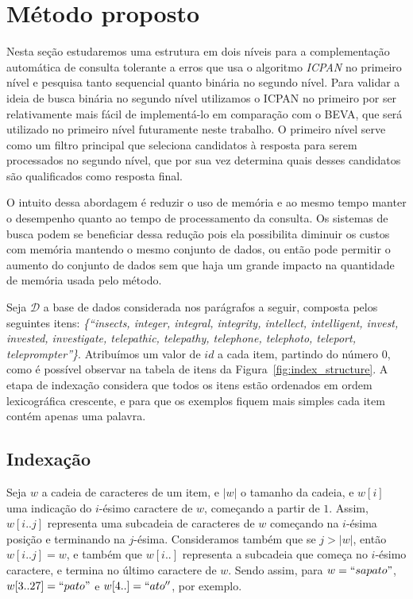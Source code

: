 \section{Método proposto} \label{sec:metodo}

Nesta seção estudaremos uma estrutura em dois níveis para a complementação automática de consulta tolerante a erros que usa o algoritmo \textit{ICPAN} no primeiro nível e pesquisa tanto sequencial quanto binária no segundo nível. Para validar a ideia de busca binária no segundo nível utilizamos o ICPAN no primeiro por ser relativamente mais fácil de implementá-lo em comparação com o BEVA, que será utilizado no primeiro nível futuramente neste trabalho. O primeiro nível serve como um filtro principal que seleciona candidatos à resposta para serem processados no segundo nível, que por sua vez determina quais desses candidatos são qualificados como resposta final.

O intuito dessa abordagem é reduzir o uso de memória e ao mesmo tempo manter o desempenho quanto ao tempo de processamento da consulta. Os sistemas de busca podem se beneficiar dessa redução pois ela possibilita diminuir os custos com memória mantendo o mesmo conjunto de dados, ou então pode permitir o aumento do conjunto de dados sem que haja um grande impacto na quantidade de memória usada pelo método.

Seja $\mathcal{D}$ a base de dados considerada nos parágrafos a seguir, composta pelos seguintes itens: \textit{\{``insects, integer, integral, integrity, intellect, intelligent, invest, invested, investigate, telepathic, telepathy, telephone, telephoto, teleport, teleprompter''\}}. Atribuímos um valor de $id$ a cada item, partindo do número $0$, como é possível observar na tabela de itens da Figura~\ref{fig:index_structure}. A etapa de indexação considera que todos os itens estão ordenados em ordem lexicográfica crescente, e para que os exemplos fiquem mais simples cada item contém apenas uma palavra.
 
\subsection{Indexação} 
\label{sec:indexing}
Seja $w$ a cadeia de caracteres de um item, e $|w|$ o tamanho da cadeia, e $w[i]$ uma indicação do $i$-ésimo caractere de $w$, começando a partir de $1$. Assim, $w[i..j]$ representa uma subcadeia de caracteres de $w$ começando na $i$-ésima posição e terminando na $j$-ésima. Consideramos também que se $j > |w|$, então $w[i..j] = w$, e também que $w[i..]$ representa a subcadeia que começa no $i$-ésimo caractere, e termina no último caractere de $w$. Sendo assim, para $w = ``sapato"$, $w[3..27] =  ``pato"$ e $w[4..] = ``ato''$, por exemplo.  

